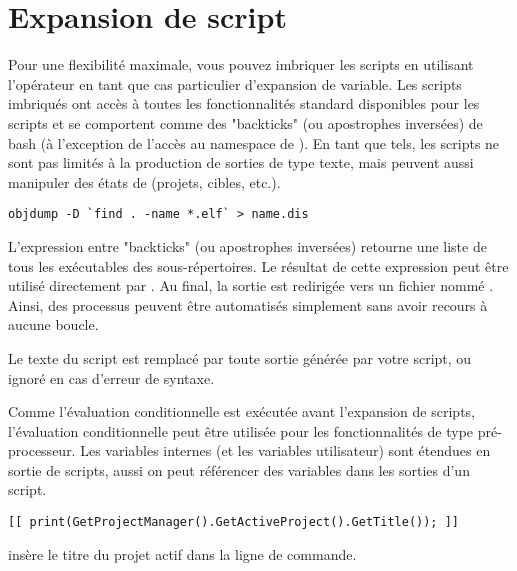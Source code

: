 \section{Expansion de script}

Pour une flexibilité maximale, vous pouvez imbriquer les scripts en utilisant l'opérateur \codeline{[[ ]]} en tant que cas particulier d'expansion de variable. Les scripts imbriqués ont accès à toutes les fonctionnalités standard disponibles pour les scripts et se comportent comme des "backticks" (ou apostrophes inversées) de bash (à l'exception de l'accès au namespace de \codeblocks ). En tant que tels, les scripts ne sont pas limités à la production de sorties de type texte, mais peuvent aussi manipuler des états de \codeblocks (projets, cibles, etc.).



\begin{lstlisting}
objdump -D `find . -name *.elf` > name.dis
\end{lstlisting}

L'expression entre "backticks" (ou apostrophes inversées) retourne une liste de tous les exécutables  des sous-répertoires. Le résultat de cette expression peut être utilisé directement par . Au final, la sortie est redirigée vers un fichier nommé . Ainsi, des processus peuvent être automatisés simplement sans avoir recours à aucune boucle.


Le texte du script est remplacé par toute sortie générée par votre script, ou ignoré en cas d'erreur de syntaxe.

Comme l'évaluation conditionnelle est exécutée avant l'expansion de scripts, l'évaluation conditionnelle peut être utilisée pour les fonctionnalités de type pré-processeur. Les variables internes (et les variables utilisateur) sont étendues en sortie de scripts, aussi on peut référencer des variables dans les sorties d'un script.

\begin{lstlisting}
[[ print(GetProjectManager().GetActiveProject().GetTitle()); ]]
\end{lstlisting}

insère le titre du projet actif dans la ligne de commande.

